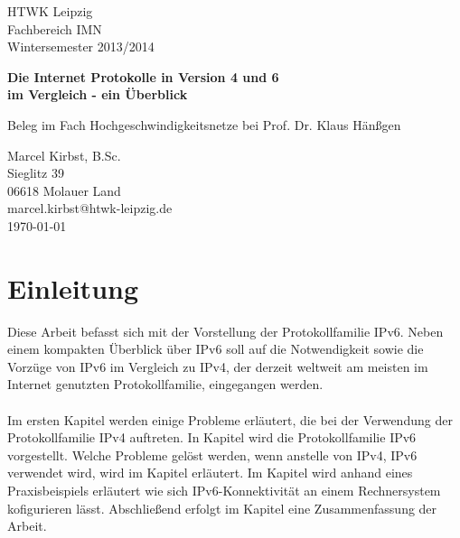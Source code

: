 \documentclass[a4paper,12pt]{scrartcl}
\begin{document}
 
\begin{titlepage}
\begin{small}
\vfill {HTWK Leipzig\\
Fachbereich IMN \\
Wintersemester 2013/2014}
\end{small}
 
\begin{center}
\begin{Large}
\vfill {\textsf{\textbf{
Die Internet Protokolle in Version 4 und 6\\
im Vergleich - ein \"Uberblick\\
}}}
\end{Large}
Beleg im Fach Hochgeschwindigkeitsnetze bei  Prof. Dr. Klaus Hänßgen
\end{center}
 
\begin{small}

\vfill
Marcel Kirbst, B.Sc. \\ Sieglitz 39 \\ 06618 Molauer Land \\
marcel.kirbst@htwk-leipzig.de\\
\today
\end{small}
 
\end{titlepage}
 
\tableofcontents

\clearpage
\listoffigures

\listoftables


\thispagestyle{empty}
 
\clearpage
 
\onehalfspacing
 
\pagestyle{plain}
 
\section{Einleitung}
\label{sec:0}
Diese Arbeit befasst sich mit der Vorstellung der Protokollfamilie IPv6. Neben einem kompakten Überblick über IPv6 soll auf die Notwendigkeit sowie die Vorzüge von IPv6 im Vergleich zu IPv4, der derzeit weltweit am meisten im Internet genutzten Protokollfamilie, eingegangen werden.\\
\\
Im ersten Kapitel  werden einige Probleme erläutert, die bei der Verwendung der Protokollfamilie IPv4 auftreten. In Kapitel  wird die Protokollfamilie IPv6 vorgestellt. Welche Probleme gelöst werden, wenn anstelle von IPv4, IPv6 verwendet wird, wird im Kapitel  erläutert. Im Kapitel  wird anhand eines Praxisbeispiels erläutert wie sich IPv6-Konnektivität an einem Rechnersystem kofigurieren lässt. Abschließend erfolgt im Kapitel  eine Zusammenfassung der Arbeit.
\end{document}
